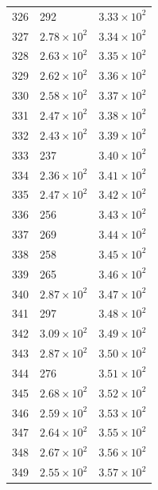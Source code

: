 \begin{table}[H]
\begin{tabular}{lll}
326 & 292 & $\displaystyle 3.33 \times 10^{2}$ \\
327 & $\displaystyle 2.78 \times 10^{2}$ & $\displaystyle 3.34 \times 10^{2}$ \\
328 & $\displaystyle 2.63 \times 10^{2}$ & $\displaystyle 3.35 \times 10^{2}$ \\
329 & $\displaystyle 2.62 \times 10^{2}$ & $\displaystyle 3.36 \times 10^{2}$ \\
330 & $\displaystyle 2.58 \times 10^{2}$ & $\displaystyle 3.37 \times 10^{2}$ \\
331 & $\displaystyle 2.47 \times 10^{2}$ & $\displaystyle 3.38 \times 10^{2}$ \\
332 & $\displaystyle 2.43 \times 10^{2}$ & $\displaystyle 3.39 \times 10^{2}$ \\
333 & 237 & $\displaystyle 3.40 \times 10^{2}$ \\
334 & $\displaystyle 2.36 \times 10^{2}$ & $\displaystyle 3.41 \times 10^{2}$ \\
335 & $\displaystyle 2.47 \times 10^{2}$ & $\displaystyle 3.42 \times 10^{2}$ \\
336 & 256 & $\displaystyle 3.43 \times 10^{2}$ \\
337 & 269 & $\displaystyle 3.44 \times 10^{2}$ \\
338 & 258 & $\displaystyle 3.45 \times 10^{2}$ \\
339 & 265 & $\displaystyle 3.46 \times 10^{2}$ \\
340 & $\displaystyle 2.87 \times 10^{2}$ & $\displaystyle 3.47 \times 10^{2}$ \\
341 & 297 & $\displaystyle 3.48 \times 10^{2}$ \\
342 & $\displaystyle 3.09 \times 10^{2}$ & $\displaystyle 3.49 \times 10^{2}$ \\
343 & $\displaystyle 2.87 \times 10^{2}$ & $\displaystyle 3.50 \times 10^{2}$ \\
344 & 276 & $\displaystyle 3.51 \times 10^{2}$ \\
345 & $\displaystyle 2.68 \times 10^{2}$ & $\displaystyle 3.52 \times 10^{2}$ \\
346 & $\displaystyle 2.59 \times 10^{2}$ & $\displaystyle 3.53 \times 10^{2}$ \\
347 & $\displaystyle 2.64 \times 10^{2}$ & $\displaystyle 3.55 \times 10^{2}$ \\
348 & $\displaystyle 2.67 \times 10^{2}$ & $\displaystyle 3.56 \times 10^{2}$ \\
349 & $\displaystyle 2.55 \times 10^{2}$ & $\displaystyle 3.57 \times 10^{2}$ \\

\end{tabular}
\end{table}
